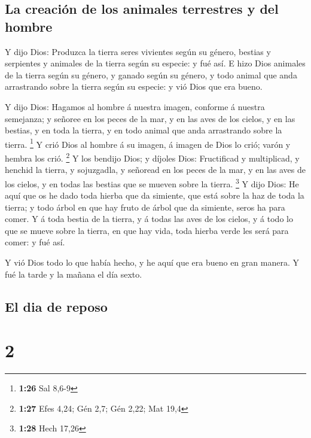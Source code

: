 \hypertarget{la-creaciuxf3n-de-los-animales-terrestres-y-del-hombre}{%
\subsection{La creación de los animales terrestres y del
hombre}\label{la-creaciuxf3n-de-los-animales-terrestres-y-del-hombre}}

 Y dijo Dios: Produzca la tierra seres vivientes según su
género, bestias y serpientes y animales de la tierra según su especie: y
fué así.  E hizo Dios animales de la tierra según su
género, y ganado según su género, y todo animal que anda arrastrando
sobre la tierra según su especie: y vió Dios que era bueno.

 Y dijo Dios: Hagamos al hombre á nuestra imagen, conforme
á nuestra semejanza; y señoree en los peces de la mar, y en las aves de
los cielos, y en las bestias, y en toda la tierra, y en todo animal que
anda arrastrando sobre la tierra. \footnote{\textbf{1:26} Sal 8,6-9}
 Y crió Dios al hombre á su imagen, á imagen de Dios lo
crió; varón y hembra los crió. \footnote{\textbf{1:27} Efes 4,24; Gén
  2,7; Gén 2,22; Mat 19,4}  Y los bendijo Dios; y díjoles
Dios: Fructificad y multiplicad, y henchid la tierra, y sojuzgadla, y
señoread en los peces de la mar, y en las aves de los cielos, y en todas
las bestias que se mueven sobre la tierra. \footnote{\textbf{1:28} Hech
  17,26}  Y dijo Dios: He aquí que os he dado toda hierba
que da simiente, que está sobre la haz de toda la tierra; y todo árbol
en que hay fruto de árbol que da simiente, seros ha para comer.
 Y á toda bestia de la tierra, y á todas las aves de los
cielos, y á todo lo que se mueve sobre la tierra, en que hay vida, toda
hierba verde les será para comer: y fué así.

 Y vió Dios todo lo que había hecho, y he aquí que era
bueno en gran manera. Y fué la tarde y la mañana el día sexto.

\hypertarget{el-dia-de-reposo}{%
\subsection{El dia de reposo}\label{el-dia-de-reposo}}

\hypertarget{section-1}{%
\section{2}\label{section-1}}

